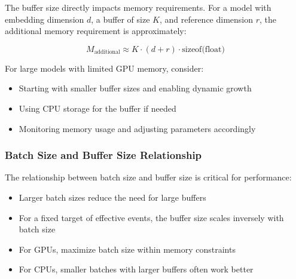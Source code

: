 The buffer size directly impacts memory requirements. For a model with embedding dimension $d$, a buffer of size $K$, and reference dimension $r$, the additional memory requirement is approximately:

\begin{equation}
  M_{\text{additional}} \approx K \cdot (d + r) \cdot \text{sizeof(float)}
\end{equation}

For large models with limited GPU memory, consider:
\begin{itemize}
\item Starting with smaller buffer sizes and enabling dynamic growth
\item Using CPU storage for the buffer if needed
\item Monitoring memory usage and adjusting parameters accordingly
\end{itemize}

\subsubsection{Batch Size and Buffer Size Relationship}

The relationship between batch size and buffer size is critical for performance:

\begin{itemize}
\item Larger batch sizes reduce the need for large buffers
\item For a fixed target of effective events, the buffer size scales inversely with batch size
\item For GPUs, maximize batch size within memory constraints
\item For CPUs, smaller batches with larger buffers often work better
\end{itemize}


